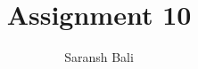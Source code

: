 \documentclass[journal,12pt,twocolumn]{IEEEtran}
\begin{document}
\makeatletter
{}
\makeatother
\let\StandardTheFigure\thefigure
\let\vec\mathbf
\renewcommand{\thefigure}{\theproblem}
\def\putbox#1#2#3{\makebox[0in][l]{\makebox[#1][l]{}\raisebox{\baselineskip}[0in][0in]{\raisebox{#2}[0in][0in]{#3}}}}
     \def\rightbox#1{\makebox[0in][r]{#1}}
     \def\centbox#1{\makebox[0in]{#1}}
     \def\topbox#1{\raisebox{-\baselineskip}[0in][0in]{#1}}
     \def\midbox#1{\raisebox{-0.5\baselineskip}[0in][0in]{#1}}
\vspace{3cm}
\title{Assignment 10}
\author{Saransh Bali}
%
%
%
% 
%
\end{document}
